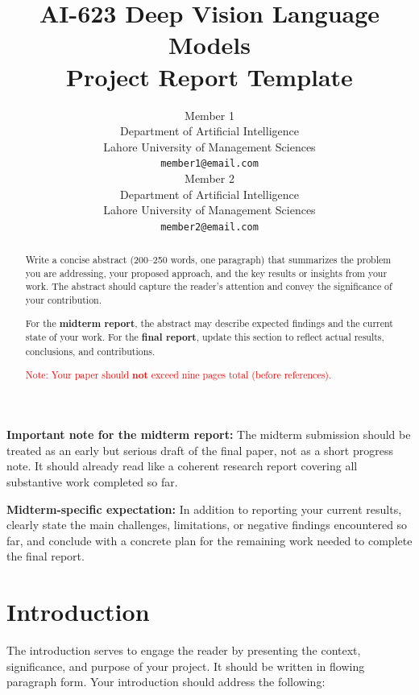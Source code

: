 \documentclass{article}
\title{AI-623 Deep Vision Language Models \\ Project Report Template}
\author{%
  Member 1 \\
  Department of Artificial Intelligence\\
  Lahore University of Management Sciences \\
  \texttt{member1@email.com} \\
  \And
  Member 2 \\
  Department of Artificial Intelligence\\
  Lahore University of Management Sciences \\
  \texttt{member2@email.com} \\
}
\begin{document}
\maketitle


\begin{abstract}
  Write a concise abstract (200--250 words, one paragraph) that summarizes the problem you are addressing, your proposed approach, and the key results or insights from your work. The abstract should capture the reader's attention and convey the significance of your contribution.

  For the \textbf{midterm report}, the abstract may describe expected findings and the current state of your work. For the \textbf{final report}, update this section to reflect actual results, conclusions, and contributions.

  \textcolor{red}{Note: Your paper should \textbf{not} exceed nine pages total (before references).}
\end{abstract}

\noindent\textbf{Important note for the midterm report:} The midterm submission should be treated as an early but serious draft of the final paper, not as a short progress note. It should already read like a coherent research report covering all substantive work completed so far.

\noindent\textbf{Midterm-specific expectation:} In addition to reporting your current results, clearly state the main challenges, limitations, or negative findings encountered so far, and conclude with a concrete plan for the remaining work needed to complete the final report.

\section{Introduction}
The introduction serves to engage the reader by presenting the context, significance, and purpose of your project. It should be written in flowing paragraph form. Your introduction should address the following:
\end{document}
